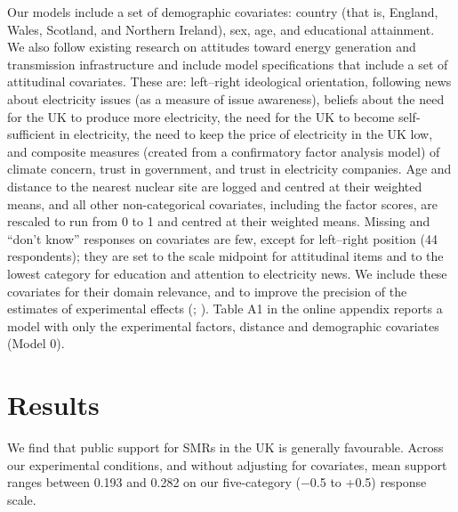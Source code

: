 \documentclass[a4paper, 11pt]{article}
\begin{document}
Our models include a set of demographic covariates: country (that is, England, Wales, Scotland, and Northern Ireland), sex, age, and educational attainment. We also follow existing research on attitudes toward energy generation and transmission infrastructure \citep{aina_poy2026,konisky2020} and include model specifications that include a set of attitudinal covariates. These are: left--right ideological orientation, following news about electricity issues (as a measure of issue awareness), beliefs about the need for the UK to produce more electricity, the need for the UK to become self-sufficient in electricity, the need to keep the price of electricity in the UK low, and composite measures (created from a confirmatory factor analysis model) of climate concern, trust in government, and trust in electricity companies. Age and distance to the nearest nuclear site are logged and centred at their weighted means, and all other non-categorical covariates, including the factor scores, are rescaled to run from 0 to 1 and centred at their weighted means. Missing and ``don't know'' responses on covariates are few, except for left--right position (44 respondents); they are set to the scale midpoint for attitudinal items and to the lowest category for education and attention to electricity news. We include these covariates for their domain relevance, and to improve the precision of the estimates of experimental effects (\citealp[pp.~96--105]{gerber2012}; \citealp{lin2013}). Table A1 in the online appendix reports a model with only the experimental factors, distance and demographic covariates (Model 0).

\section*{Results}

We find that public support for SMRs in the UK is generally favourable. Across our experimental conditions, and without adjusting for covariates, mean support ranges between 0.193 and 0.282 on our five-category ($-$0.5 to +0.5) response scale.
\end{document}
